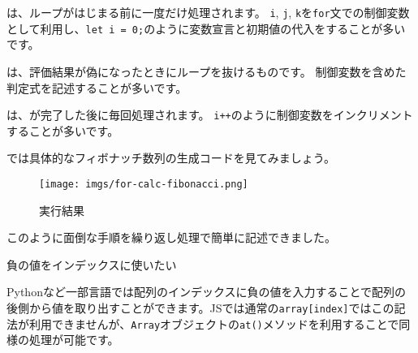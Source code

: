 は、ループがはじまる前に一度だけ処理されます。 \texttt{i}, \texttt{j},
\texttt{k}を\texttt{for}文での制御変数として利用し、\texttt{let\ i\ =\ 0;}のように変数宣言と初期値の代入をすることが多いです。

は、評価結果が偽になったときにループを抜けるものです。
制御変数を含めた判定式を記述することが多いです。

は、が完了した後に毎回処理されます。
\texttt{i++}のように制御変数をインクリメントすることが多いです。

では具体的なフィボナッチ数列の生成コードを見てみましょう。

\begin{Shaded}
\begin{Highlighting}[]
\OperatorTok{=}\NormalTok{ []}\OperatorTok{;}
\NormalTok{ (}\OperatorTok{=} \OperatorTok{;}\OperatorTok{\textless{}=} \OperatorTok{;}\OperatorTok{++}\NormalTok{) \{}
  \OperatorTok{=}\OperatorTok{;}
  \OperatorTok{\textless{}} \NormalTok{) \{}
\NormalTok{(}\NormalTok{)}\OperatorTok{;}
\NormalTok{  \} }\NormalTok{ \{}
\NormalTok{(fibonacciSeries[len }\OperatorTok{{-}} \NormalTok{] }\OperatorTok{+}\NormalTok{ fibonacciSeries[len }\OperatorTok{{-}} \NormalTok{])}\OperatorTok{;}
\NormalTok{  \}}
\NormalTok{\}}
\OperatorTok{;} \CommentTok{// [1, 1, 2, 3, 5, 8, 13, 21, 34, 55]}
\end{Highlighting}
\end{Shaded}

\begin{figure}
\centering
\texttt{[image: imgs/for-calc-fibonacci.png]}
\caption{実行結果}
\end{figure}

このように面倒な手順を繰り返し処理で簡単に記述できました。

負の値をインデックスに使いたい

Pythonなど一部言語では配列のインデックスに負の値を入力することで配列の後側から値を取り出すことができます。JSでは通常の\texttt{array{[}index{]}}ではこの記法が利用できませんが、\texttt{Array}オブジェクトの\texttt{at()}メソッドを利用することで同様の処理が可能です。

